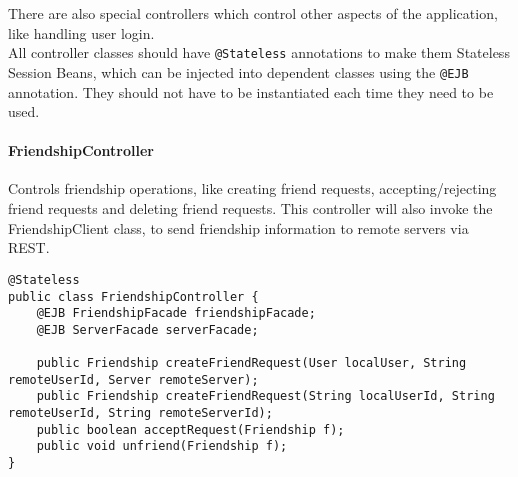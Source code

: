 There are also special controllers which control other aspects of the application, like handling user login.\\
All controller classes should have \texttt{@Stateless} annotations to make them Stateless Session Beans, which can be injected into dependent classes using the \texttt{@EJB} annotation. They should not have to be instantiated each time they need to be used.



\paragraph{FriendshipController} Controls friendship operations, like creating friend requests, accepting/rejecting friend requests and deleting friend requests. This controller will also invoke the FriendshipClient class, to send friendship information to remote servers via REST.

\begin{small}\begin{verbatim}
@Stateless
public class FriendshipController {
    @EJB FriendshipFacade friendshipFacade;
    @EJB ServerFacade serverFacade;
    
    public Friendship createFriendRequest(User localUser, String remoteUserId, Server remoteServer);
    public Friendship createFriendRequest(String localUserId, String remoteUserId, String remoteServerId);
    public boolean acceptRequest(Friendship f);
    public void unfriend(Friendship f);   
}
\end{verbatim}\end{small}

